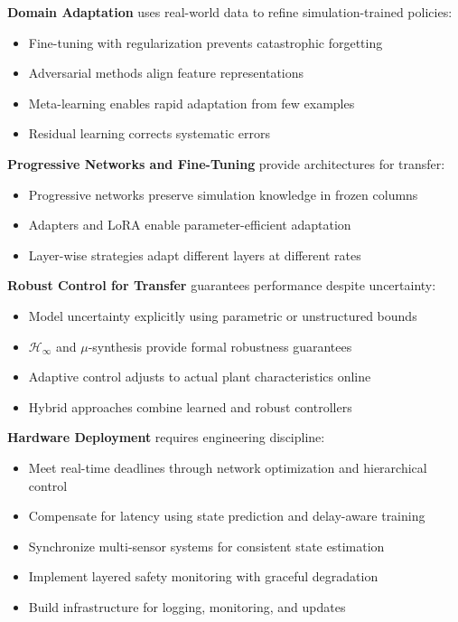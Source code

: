 \textbf{Domain Adaptation} uses real-world data to refine simulation-trained policies:
\begin{itemize}
    \item Fine-tuning with regularization prevents catastrophic forgetting
    \item Adversarial methods align feature representations
    \item Meta-learning enables rapid adaptation from few examples
    \item Residual learning corrects systematic errors
\end{itemize}

\textbf{Progressive Networks and Fine-Tuning} provide architectures for transfer:
\begin{itemize}
    \item Progressive networks preserve simulation knowledge in frozen columns
    \item Adapters and LoRA enable parameter-efficient adaptation
    \item Layer-wise strategies adapt different layers at different rates
\end{itemize}

\textbf{Robust Control for Transfer} guarantees performance despite uncertainty:
\begin{itemize}
    \item Model uncertainty explicitly using parametric or unstructured bounds
    \item $\mathcal{H}_\infty$ and $\mu$-synthesis provide formal robustness guarantees
    \item Adaptive control adjusts to actual plant characteristics online
    \item Hybrid approaches combine learned and robust controllers
\end{itemize}

\textbf{Hardware Deployment} requires engineering discipline:
\begin{itemize}
    \item Meet real-time deadlines through network optimization and hierarchical control
    \item Compensate for latency using state prediction and delay-aware training
    \item Synchronize multi-sensor systems for consistent state estimation
    \item Implement layered safety monitoring with graceful degradation
    \item Build infrastructure for logging, monitoring, and updates
\end{itemize}

